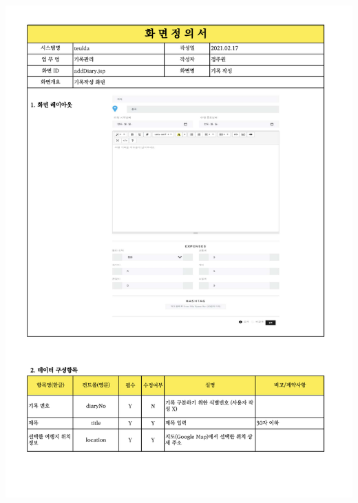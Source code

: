 {{{{{{{{{{{{{{{{{{{{{\includegraphics[width=20cm]{./Figure/Design/Display/diary/diary_03.pdf} \\
}}}}}}}}}}}}}}}}}}}}}
